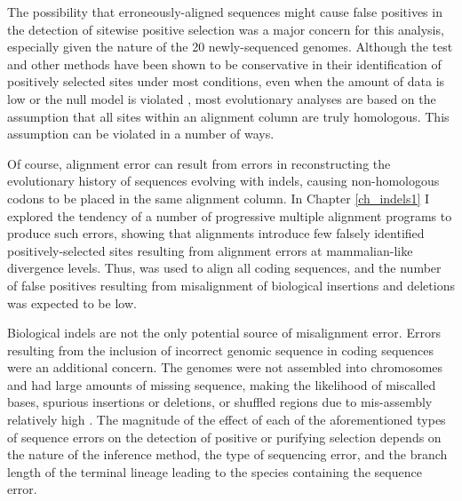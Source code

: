\label{section_error_impact}

The possibility that erroneously-aligned sequences might cause false
positives in the detection of sitewise positive selection was a major
concern for this analysis, especially given the \lcv nature of the 20
newly-sequenced genomes. Although the \slr test and other \sw \ml
methods have been shown to be conservative in their identification of
positively selected sites under most conditions, even when the amount
of data is low or the null model is violated
\citep{Anisimova2002,Anisimova2003,Massingham2005}, most evolutionary
analyses are based on the assumption that all sites within an
alignment column are truly homologous. This assumption can be violated
in a number of ways.

Of course, alignment error can result from errors in reconstructing
the evolutionary history of sequences evolving with indels, causing
non-homologous codons to be placed in the same alignment column. In
Chapter \ref{ch_indels1} I explored the tendency of a number of
progressive multiple alignment programs to produce such errors,
showing that \prankc alignments introduce few falsely identified
positively-selected sites resulting from alignment errors at
mammalian-like divergence levels. Thus, \prankc was used to align all
coding sequences, and the number of false positives resulting from
misalignment of biological insertions and deletions was expected to be
low.

Biological indels are not the only potential source of misalignment
error. Errors resulting from the inclusion of incorrect genomic
sequence in coding sequences were an additional concern. The \lcv
genomes were not assembled into chromosomes and had large amounts of
missing sequence, making the likelihood of miscalled bases, spurious
insertions or deletions, or shuffled regions due to mis-assembly
relatively high \citep{Green2007}. The magnitude of the effect of each
of the aforementioned types of sequence errors on the detection of
positive or purifying selection depends on the nature of the inference
method, the type of sequencing error, and the branch length of the
terminal lineage leading to the species containing the sequence error.

